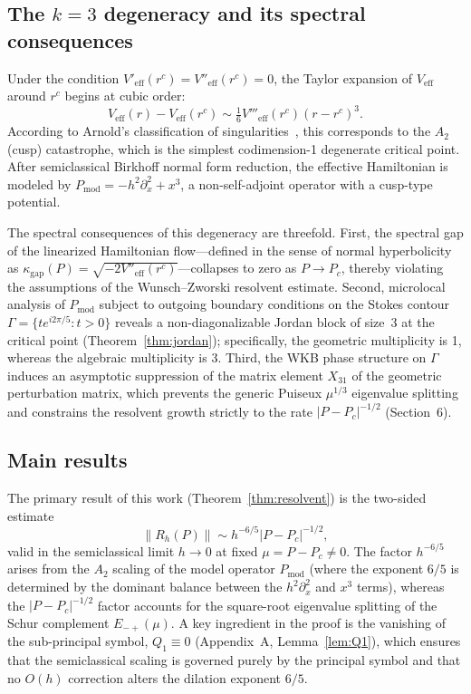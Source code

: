 \documentclass[12pt,a4paper]{amsart}
\theoremstyle{remark}
\begin{document}
\subsection*{The $k\!=\!3$ degeneracy and its spectral consequences}

Under the condition $V'_{\mathrm{eff}}(r^c) = V''_{\mathrm{eff}}(r^c) = 0$, the Taylor
expansion of $V_{\mathrm{eff}}$ around $r^c$ begins at cubic order:
\[
  V_{\mathrm{eff}}(r) - V_{\mathrm{eff}}(r^c) \sim \tfrac{1}{6}V'''_{\mathrm{eff}}(r^c)(r-r^c)^3.
\]
According to Arnold's classification of singularities~\cite{Arnold72}, this corresponds to the $A_2$ (cusp)
catastrophe, which is the simplest codimension-1 degenerate critical point. After semiclassical
Birkhoff normal form reduction, the effective Hamiltonian is modeled by
$P_{\mathrm{mod}} = -h^2\partial_x^2 + x^3$, a non-self-adjoint operator with a
cusp-type potential.

The spectral consequences of this degeneracy are threefold. First, the spectral gap of the linearized
Hamiltonian flow---defined in the sense of normal hyperbolicity as $\kappa_{\mathrm{gap}}(P) = \sqrt{-2V''_{\mathrm{eff}}(r^c)}$---collapses to zero as $P \to P_c$, thereby violating the assumptions of the Wunsch--Zworski
resolvent estimate. Second, microlocal analysis of $P_{\mathrm{mod}}$ subject to
outgoing boundary conditions on the Stokes contour $\Gamma = \{te^{i2\pi/5}: t > 0\}$
reveals a non-diagonalizable Jordan block of size~3 at the critical point (Theorem~\ref{thm:jordan});
specifically, the geometric multiplicity is 1, whereas the algebraic multiplicity is 3. Third, the WKB
phase structure on $\Gamma$ induces an asymptotic suppression of the matrix element $X_{31}$ of
the geometric perturbation matrix, which prevents the generic Puiseux $\mu^{1/3}$ eigenvalue
splitting and constrains the resolvent growth strictly to the rate $|P-P_c|^{-1/2}$
(Section~6).

\subsection*{Main results}

The primary result of this work (Theorem~\ref{thm:resolvent}) is the two-sided estimate
\[
  \|R_h(P)\| \sim h^{-6/5}|P - P_c|^{-1/2},
\]
valid in the semiclassical limit $h \to 0$ at fixed $\mu = P - P_c \neq 0$.
The factor $h^{-6/5}$ arises from the $A_2$ scaling of the model operator $P_{\mathrm{mod}}$
(where the exponent $6/5$ is determined by the dominant balance between the $h^2\partial_x^2$ and $x^3$
terms), whereas the $|P-P_c|^{-1/2}$ factor accounts for the square-root eigenvalue splitting
of the Schur complement $E_{-+}(\mu)$.
A key ingredient in the proof is the vanishing of the sub-principal symbol,
$Q_1 \equiv 0$ (Appendix~A, Lemma~\ref{lem:Q1}), which ensures that the semiclassical
scaling is governed purely by the principal symbol and that no $O(h)$ correction
alters the dilation exponent $6/5$.
\end{document}
